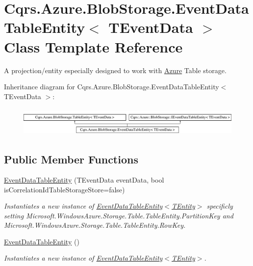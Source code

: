 \hypertarget{classCqrs_1_1Azure_1_1BlobStorage_1_1EventDataTableEntity}{}\section{Cqrs.\+Azure.\+Blob\+Storage.\+Event\+Data\+Table\+Entity$<$ T\+Event\+Data $>$ Class Template Reference}
\label{classCqrs_1_1Azure_1_1BlobStorage_1_1EventDataTableEntity}


A projection/entity especially designed to work with \hyperlink{namespaceCqrs_1_1Azure}{Azure} Table storage.  


Inheritance diagram for Cqrs.\+Azure.\+Blob\+Storage.\+Event\+Data\+Table\+Entity$<$ T\+Event\+Data $>$\+:\begin{figure}[H]
\begin{center}
\leavevmode
\includegraphics[height=1.477572cm]{classCqrs_1_1Azure_1_1BlobStorage_1_1EventDataTableEntity}
\end{center}
\end{figure}
\subsection*{Public Member Functions}
\begin{DoxyCompactItemize}
\item 
\hyperlink{classCqrs_1_1Azure_1_1BlobStorage_1_1EventDataTableEntity_a90c39733d651a5a71497909089e67c1a_a90c39733d651a5a71497909089e67c1a}{Event\+Data\+Table\+Entity} (T\+Event\+Data event\+Data, bool is\+Correlation\+Id\+Table\+Storage\+Store=false)
\begin{DoxyCompactList}\small\item\em Instantiates a new instance of \hyperlink{classCqrs_1_1Azure_1_1BlobStorage_1_1EventDataTableEntity_a90c39733d651a5a71497909089e67c1a_a90c39733d651a5a71497909089e67c1a}{Event\+Data\+Table\+Entity$<$\+T\+Entity$>$} specificly setting Microsoft.\+Windows\+Azure.\+Storage.\+Table.\+Table\+Entity.\+Partition\+Key and Microsoft.\+Windows\+Azure.\+Storage.\+Table.\+Table\+Entity.\+Row\+Key. \end{DoxyCompactList}\item 
\hyperlink{classCqrs_1_1Azure_1_1BlobStorage_1_1EventDataTableEntity_a6785ad2dd88c6db1ec4a2d8d474b557d_a6785ad2dd88c6db1ec4a2d8d474b557d}{Event\+Data\+Table\+Entity} ()
\begin{DoxyCompactList}\small\item\em Instantiates a new instance of \hyperlink{classCqrs_1_1Azure_1_1BlobStorage_1_1EventDataTableEntity_a90c39733d651a5a71497909089e67c1a_a90c39733d651a5a71497909089e67c1a}{Event\+Data\+Table\+Entity$<$\+T\+Entity$>$}. \end{DoxyCompactList}\end{DoxyCompactItemize}
